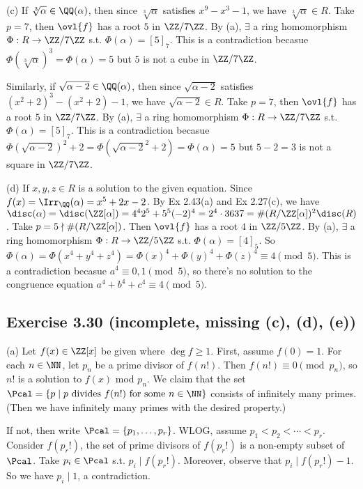 \documentclass[../Chapter.tex]{subfiles}
\begin{document}
(c) If $\sqrt[3]{\alpha}\in\QQ(\alpha)$, then since $\sqrt[3]{\alpha}$ satisfies $x^9-x^3-1$, we have $\sqrt[3]{\alpha}\in R$. Take $p=7$, then $\ovl{f}$ has a root $5$ in $\ZZ/7\ZZ$. By (a), $\exists$ a ring homomorphism $\Phi:R\to\ZZ/7\ZZ$ s.t. $\Phi(\alpha)=[5]_7$. This is a contradiction becasue $\Phi(\sqrt[3]{\alpha})^3=\Phi(\alpha)=5$ but $5$ is not a cube in $\ZZ/7\ZZ$.

Similarly, if $\sqrt{\alpha-2}\in\QQ(\alpha)$, then since $\sqrt{\alpha-2}$ satisfies $(x^2+2)^3-(x^2+2)-1$, we have $\sqrt{\alpha-2}\in R$. Take $p=7$, then $\ovl{f}$ has a root $5$ in $\ZZ/7\ZZ$. By (a), $\exists$ a ring homomorphism $\Phi:R\to\ZZ/7\ZZ$ s.t. $\Phi(\alpha)=[5]_7$. This is a contradiction becasue $\Phi(\sqrt{\alpha-2})^2+2=\Phi(\sqrt{\alpha-2}^2+2)=\Phi(\alpha)=5$ but $5-2=3$ is not a square in $\ZZ/7\ZZ$.

(d) If $x,y,z\in R$ is a solution to the given equation. Since $f(x)=\Irr_\QQ(\alpha)=x^5+2x-2$. By Ex 2.43(a) and Ex 2.27(c), we have $\disc(\alpha)=\disc(\ZZ[\alpha])=4^42^5+5^5(-2)^4=2^4\cdot 3637=\#(R/\ZZ[\alpha])^2\disc(R)$. Take $p=5\nmid \#(R/\ZZ[\alpha])$. Then $\ovl{f}$ has a root $4$ in $\ZZ/5\ZZ$. By (a), $\exists$ a ring homomorphism $\Phi:R\to\ZZ/5\ZZ$ s.t. $\Phi(\alpha)=[4]_5$. So $\Phi(\alpha)=\Phi(x^4+y^4+z^4)=\Phi(x)^4+\Phi(y)^4+\Phi(z)^4\equiv 4\pmod{5}$. This is a contradiction becasue $a^4\equiv 0,1 \pmod{5}$, so there's no solution to the congruence equation $a^4+b^4+c^4\equiv 4\pmod{5}$.

\subsection*{Exercise 3.30 \color{red}(incomplete, missing (c), (d), (e))}

(a) Let $f(x)\in\ZZ[x]$ be given where $\deg f\geq1$. First, assume $f(0)=1$. For each $n\in\NN$, let $p_n$ be a prime divisor of $f(n!)$. Then $f(n!)\equiv 0 \pmod{p_n}$, so $n!$ is a solution to $f(x)$ mod $p_n$. We claim that the set $\Pcal=\{ p \mid p \text{ divides } f(n!) \text{ for some } n\in\NN\}$ consists of infinitely many primes. (Then we have infinitely many primes with the desired property.)

If not, then write $\Pcal=\{p_1,\ldots,p_r\}$. WLOG, assume $p_1<p_2<\cdots<p_r$. Consider $f(p_r!)$, the set of prime divisors of $f(p_r!)$ is a non-empty subset of $\Pcal$. Take $p_i\in\Pcal$ s.t. $p_i\mid f(p_r!)$. Moreover, observe that $p_i\mid f(p_r!)-1$. So we have $p_i\mid 1$, a contradiction.
\end{document}
